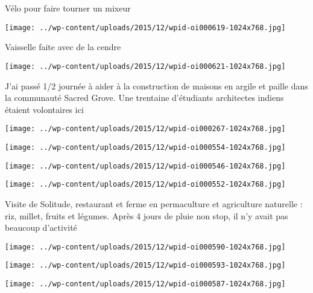  \newline
 Vélo pour faire tourner un mixeur \newline
 \newline
\centerline{\texttt{[image: ../wp-content/uploads/2015/12/wpid-oi000619-1024x768.jpg]} } 
 \newline
 Vaisselle faite avec de la cendre \newline
 \newline
\centerline{\texttt{[image: ../wp-content/uploads/2015/12/wpid-oi000621-1024x768.jpg]} } 
 \newline
 J'ai passé 1/2 journée à aider à la construction de maisons en argile et paille dans la communauté Sacred Grove. Une trentaine d'étudiants architectes indiens étaient volontaires ici \newline
 \newline
\centerline{\texttt{[image: ../wp-content/uploads/2015/12/wpid-oi000267-1024x768.jpg]} } 
 \newline
 \newline
\centerline{\texttt{[image: ../wp-content/uploads/2015/12/wpid-oi000554-1024x768.jpg]} } 
 \newline
 \newline
\centerline{\texttt{[image: ../wp-content/uploads/2015/12/wpid-oi000546-1024x768.jpg]} } 
 \newline
 \newline
\centerline{\texttt{[image: ../wp-content/uploads/2015/12/wpid-oi000552-1024x768.jpg]} } 
 \newline
 Visite de Solitude, restaurant et ferme en permaculture et agriculture naturelle : riz, millet, fruits et légumes. Après 4 jours de pluie non stop, il n'y avait pas beaucoup d'activité \newline
 \newline
\centerline{\texttt{[image: ../wp-content/uploads/2015/12/wpid-oi000590-1024x768.jpg]} } 
 \newline
 \newline
\centerline{\texttt{[image: ../wp-content/uploads/2015/12/wpid-oi000593-1024x768.jpg]} } 
 \newline
 \newline
\centerline{\texttt{[image: ../wp-content/uploads/2015/12/wpid-oi000587-1024x768.jpg]} } 
 \newline

\newpage
 
